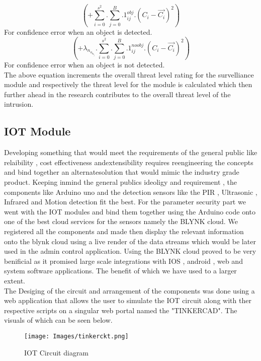 \documentclass[letterpaper, 10 pt, conference]{ieeeconf}  %
\begin{document}
\begin{equation}
(+ \sum_{i=0}^{s^2} . \sum_{j=0}^{B} .  1_{ij}^{obj} . (C_i - \vec{C_i})^2 )
\end{equation}
For confidence error when an object is detected.\\
\begin{equation}
(+\lambda_n_o_o_b_j .  \sum_{i=0}^{s^2} . \sum_{j=0}^{B} .  1_{ij}^{noobj} . (C_i - \vec{C_i})^2 )
\end{equation}
For confidence error when an object is not detected.\\

The above equation increments the overall threat level rating for the survelliance module and respectively the threat level for the module is calculated which then further ahead in the research contributes to the overall threat level of the intrusion.


\subsection{IOT Module}
Developing something that would meet
the requirements of the general public like relaibility , cost effectiveness andextensibility requires reengineering the concepts and bind together an alternatesolution that would mimic the industry grade product. Keeping inmind the general
publics ideoligy and requirement , the components like Arduino uno and the detection sensors like the PIR , Ultrasonic , Infrared and Motion detection fit the best. For the parameter security part we went with the IOT modules and bind them together using the Arduino code onto one of the best cloud services for the sensors namely the BLYNK cloud. We registered all the components and made then display the relevant information onto the blynk cloud using a live render of the data streams which would be later used in the admin control application. Using the BLYNK cloud proved to be very benificial as it promised large scale integrations with IOS , android , web and system software applications. The benefit of which we have used to a larger extent.\cite{c3}\\
The Desiging of the circuit and arrangement of the components was done using a web application that allows the user to simulate the IOT circuit along with ther respective scripts on a singular web portal named the "TINKERCAD". The visuals of which can be seen below.\\

\begin{figure}[thpb]
      \centering
      {{\texttt{[image: Images/tinkerckt.png]}}}
      \caption{IOT Circuit diagram}
      \label{fig:2}
\end{figure}
\end{document}
